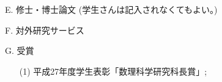 \documentclass[a4j,twocolumn]{jarticle}
\begin{document}


\vspace{0.2cm}




\noindent
E. 修士・博士論文 (学生さんは記入されなくてもよい。)

\vspace{0.1cm}



\vspace{0.2cm}
\noindent
F. 対外研究サービス

\vspace{0.1cm}



\vspace{0.2cm}
\noindent
G. 受賞

\vspace{0.1cm}
\begin{enumerate}
	\item[(1)] 平成27年度学生表彰「数理科学研究科長賞」;
\end{enumerate}
\end{document}
